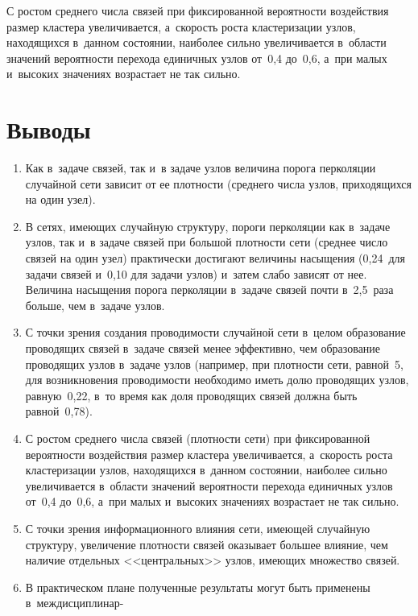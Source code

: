 \begin{multicols}{2}
  С ростом среднего числа связей при фиксированной вероятности воздействия 
размер кластера увеличивается, а~ско\-рость рос\-та клас\-те\-ри\-за\-ции узлов, 
находящихся в~данном со\-сто\-янии, наиболее сильно увеличивается в~об\-ласти 
значений ве\-ро\-ят\-ности перехода единичных узлов от~0,4 до~0,6, а~при малых 
и~высоких значениях воз\-рас\-та\-ет не так \mbox{сильно}.

\vspace*{-6pt}
  
  \section{Выводы}
  
  \noindent
  \begin{enumerate}[1.]
\item Как в~задаче связей, так и~в задаче узлов величина порога перколяции 
случайной сети зависит от ее плот\-ности (среднего чис\-ла узлов, приходящихся 
на один узел).\\[-13pt]
\item В сетях, имеющих случайную структуру, пороги перколяции как в~задаче 
узлов, так и~в задаче связей при большой плот\-ности сети (среднее число связей 
на один узел) практически достигают величины насыщения (0,24~для задачи 
связей и~0,10 для задачи узлов) и~затем слабо зависят от нее. Величина 
насыщения порога перколяции в~задаче связей почти в~2,5~раза больше, чем 
в~задаче узлов.\\[-13pt] 
\item С точки зрения создания про\-во\-ди\-мости случайной сети в~целом 
образование про\-во\-дя\-щих связей в~задаче связей менее эффективно, чем 
образование проводящих узлов в~задаче узлов (например, при плотности сети, 
рав\-ной~5, для возникновения про\-во\-ди\-мости необходимо иметь долю 
проводящих узлов, равную~0,22, в~то время как доля проводящих связей 
должна быть равной~0,78).\\[-13pt] 
\item С ростом среднего чис\-ла связей (плот\-ности сети) при фиксированной 
ве\-ро\-ят\-ности воздействия раз\-мер клас\-те\-ра увеличивается, а~ско\-рость роста 
клас\-те\-ри\-за\-ции узлов, находящихся в~данном состоянии, наиболее сильно 
увеличивается в~области значений ве\-ро\-ят\-ности перехода единичных узлов 
от~0,4 до~0,6, а~при малых и~высоких значениях возрастает не так сильно.\\[-13pt] 
\item С точки зрения информационного влияния сети, име\-ющей случайную 
структуру, увеличение плот\-ности связей оказывает большее влияние, чем 
наличие отдельных <<центральных>> узлов, име\-ющих множество связей.\\[-13pt] 
\item В практическом плане полученные результаты могут быть применены 
в~междисциплинар-\linebreak\vspace*{-12pt}


\end{enumerate}
\end{multicols}
